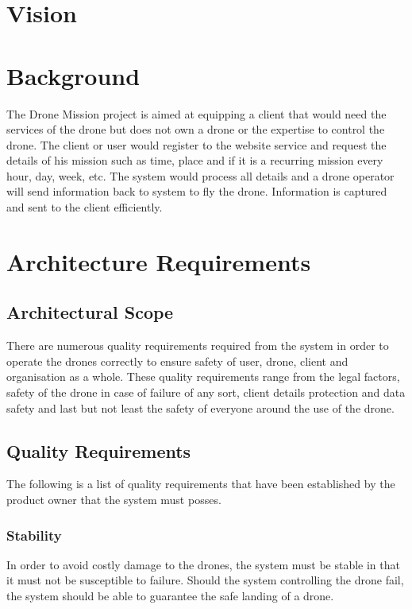 \documentclass{article}
\begin{document}
	\section{Vision}%
	
	
	
	\section{Background} %
	The Drone Mission project is aimed at equipping a client that would need the services of the drone but does not own a drone or the expertise to control the drone. The client or user would register to the website service and request the details of his mission such as time, place and if it is a recurring mission every hour, day, week, etc. The system would process all details and a drone operator will send information back to system to fly the drone. Information is captured and sent to the client efficiently.
	\newpage
	
	\section{Architecture Requirements}%
	\subsection{Architectural Scope}%
	There are numerous quality requirements required from the system in order to operate the drones correctly to ensure safety of user, drone, client and organisation as a whole. These quality requirements range from the legal factors, safety of the drone in case of failure of any sort, client details protection and data safety and last but not least the safety of everyone around the use of the drone.
	
	\setlength{\leftskip}{45px}
	\lipsum[2]
	
	\subsection{Quality Requirements}%
	The following is a list of quality requirements that have been established by the product owner that the system must posses.
	\subsubsection{Stability}
	\setlength{\leftskip}{61px}
	In order to avoid costly damage to the drones, the system must be stable in that it must not be susceptible to failure. Should the system controlling the drone fail, the system should be able to guarantee the safe landing of a drone.
	
\end{document}
